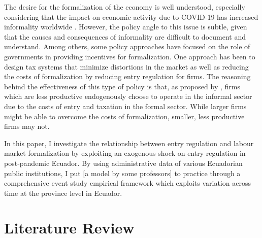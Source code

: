 \documentclass[12pt,a4paper]{article}\usepackage[]{graphicx}\usepackage[]{xcolor}
\begin{document}
The desire for the formalization of the economy is well understood, especially considering that the impact on economic activity due to COVID-19 has increased informality worldwide \parencite{ILO.2022}. However, the policy angle to this issue is subtle, given that the causes and consequences of informality are difficult to document and understand. Among others, some policy approaches have focused on the role of governments in providing incentives for formalization. One approach has been to design tax systems that minimize distortions in the market \parencite{Bardey.2019} as well as reducing the costs of formalization by reducing entry regulation for firms. The reasoning behind the effectiveness of this type of policy is that, as proposed by \textcite{MauricioPrado.2011}, firms which are less productive endogenously choose to operate in the informal sector due to the costs of entry and taxation in the formal sector. While larger firms might be able to overcome the costs of formalization, smaller, less productive firms may not.

In this paper, I investigate the relationship between entry regulation and labour market formalization by exploiting an exogenous shock on entry regulation in post-pandemic Ecuador. By using administrative data of various Ecuadorian public institutions, I put [a model by some professors] to practice through a comprehensive event study empirical framework which exploits variation across time at the province level in Ecuador. 




\section{Literature Review}

\end{document}
